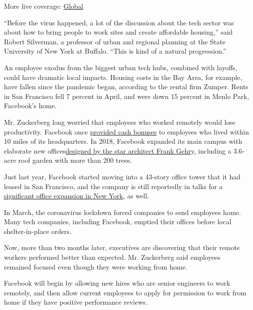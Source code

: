 More live coverage:
\href{https://www.nytimes.com/2020/08/03/world/coronavirus-covid-19.html?action=click\&pgtype=Article\&state=default\&region=MAIN_CONTENT_1\&context=storylines_live_updates}{Global}

``Before the virus happened, a lot of the discussion about the tech
sector was about how to bring people to work sites and create affordable
housing,'' said Robert Silverman, a professor of urban and regional
planning at the State University of New York at Buffalo. ``This is kind
of a natural progression.''

An employee exodus from the biggest urban tech hubs, combined with
layoffs, could have dramatic local impacts. Housing costs in the Bay
Area, for example, have fallen since the pandemic began, according to
the rental firm Zumper. Rents in San Francisco fell 7 percent in April,
and were down 15 percent in Menlo Park, Facebook's home.

Mr. Zuckerberg long worried that employees who worked remotely would
lose productivity. Facebook once
\href{https://www.reuters.com/article/us-facebook-benefits-idUSKBN0U02P620151217}{provided
cash bonuses} to employees who lived within 10 miles of its
headquarters. In 2018, Facebook expanded its main campus with elaborate
new
offices\href{https://www.bloomberg.com/news/photo-essays/2018-09-04/here-s-a-first-look-inside-facebook-s-new-frank-gehry-designed-office}{designed
by the star architect Frank Gehry}, including a 3.6-acre roof garden
with more than 200 trees.

Just last year, Facebook started moving into a 43-story office tower
that it had leased in San Francisco, and the company is still reportedly
in talks for a
\href{https://commercialobserver.com/2020/05/facebook-closing-on-740000-square-feet-at-farley-post-office/\#.XsbsRx55EbV.twitter}{significant
office expansion in New York}, as well.

In March, the coronavirus lockdown forced companies to send employees
home. Many tech companies, including Facebook, emptied their offices
before local shelter-in-place orders.

Now, more than two months later, executives are discovering that their
remote workers performed better than expected. Mr. Zuckerberg said
employees remained focused even though they were working from home.

Facebook will begin by allowing new hires who are senior engineers to
work remotely, and then allow current employees to apply for permission
to work from home if they have positive performance reviews.

